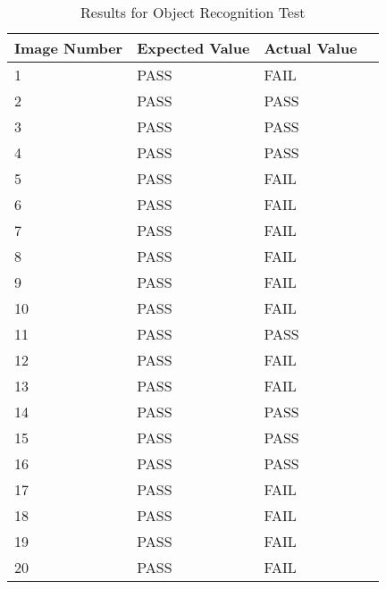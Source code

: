 \begin{table}[h]
\centering
\small
\begin{tabular}{llll}
\hline
\textbf{Image Number} & \textbf{Expected Value} & \textbf{Actual Value} 
\\ \hline
1                  & PASS                 & FAIL                      \\ 
2       & PASS                 & PASS                        \\ 
3     & PASS                 & PASS                         \\ 
4      & PASS                 & PASS                     \\ 
5    & PASS                 & FAIL                         \\ 
6             & PASS                 & FAIL                          \\ 
7             & PASS                 & FAIL                          \\ 
8             & PASS                 & FAIL                          \\ 
9             & PASS                 & FAIL                          \\ 
10             & PASS                 & FAIL                          \\ 
11            & PASS                 & PASS                          \\ 
12            & PASS                 & FAIL                          \\ 
13             & PASS                 & FAIL                          \\ 
14             & PASS                 & PASS                          \\ 
15             & PASS                 & PASS                          \\ 
16             & PASS                 & PASS                          \\ 
17             & PASS                 & FAIL                          \\ 
18             & PASS                 & FAIL                          \\ 
19             & PASS                 & FAIL                          \\ 
20             & PASS                 & FAIL                          \\ \hline
\end{tabular}
\caption{Results for Object Recognition Test\protect {\label{tab:object_rec}}}
\end{table}
	